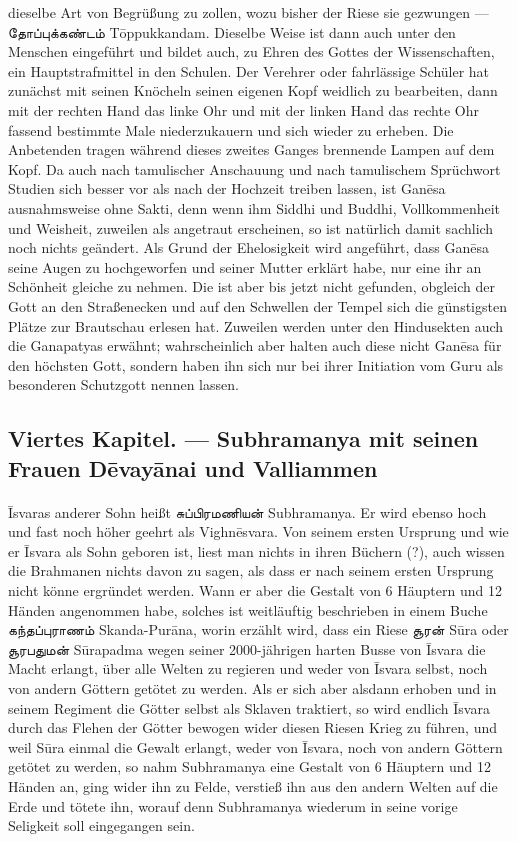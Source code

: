 \documentclass{article}
\newcommand{\TamilText}[1]{\texttamil{#1}}
\newcommand{\tam}[1]{\TamilText{#1}}
\begin{document}
dieselbe Art von Begrüßung zu zollen, wozu bisher der Riese sie gezwungen — \tam{தோப்புக்கண்டம்} T\={o}ppukkandam. Dieselbe Weise ist dann auch unter den Menschen eingeführt und bildet auch, zu Ehren des Gottes der Wissenschaften, ein Hauptstrafmittel in den Schulen. Der Verehrer oder fahrlässige Schüler hat zunächst mit seinen Knöcheln seinen eigenen Kopf weidlich zu bearbeiten, dann mit der rechten Hand das linke Ohr und mit der linken Hand das rechte Ohr fassend bestimmte Male niederzukauern und sich wieder zu erheben. Die Anbetenden tragen während dieses zweites Ganges brennende Lampen auf dem Kopf. Da auch nach tamulischer Anschauung und nach tamulischem Sprüchwort Studien sich besser vor als nach der Hochzeit treiben lassen, ist Gan\={e}sa ausnahmsweise ohne Sakti, denn wenn ihm Siddhi und Buddhi, Vollkommenheit und Weisheit, zuweilen als angetraut erscheinen, so ist natürlich damit sachlich noch nichts geändert. Als Grund der Ehelosigkeit wird angeführt, dass Gan\={e}sa seine Augen zu hochgeworfen und seiner Mutter erklärt habe, nur eine ihr an Schönheit gleiche zu nehmen. Die ist aber bis jetzt nicht gefunden, obgleich der Gott an den Straßenecken und auf den Schwellen der Tempel sich die günstigsten Plätze zur Brautschau erlesen hat. Zuweilen werden unter den Hindusekten auch die Ganapatyas erwähnt; wahrscheinlich aber halten auch diese nicht Gan\={e}sa für den höchsten Gott, sondern haben ihn sich nur bei ihrer Initiation vom Guru als besonderen Schutzgott nennen lassen.
\clearpage
\subsection{Viertes Kapitel. — Subhramanya mit seinen Frauen D\={e}vay\={a}nai und Valliammen}
\paragraph{}
\={I}svaras anderer Sohn heißt \tam{சுப்பிரமணியன்} Subhramanya. Er wird ebenso hoch und fast noch höher geehrt als Vighn\={e}svara. Von seinem ersten Ursprung und wie er \={I}svara als Sohn geboren ist, liest man nichts in ihren Büchern (?), auch wissen die Brahmanen nichts davon zu sagen, als dass er nach seinem ersten Ursprung nicht könne ergründet werden. Wann er aber die Gestalt von 6 Häuptern und 12 Händen angenommen habe, solches ist weitläuftig beschrieben in einem Buche \tam{கந்தப்புராணம்} Skanda-Pur\={a}na, worin erzählt wird, dass ein Riese \tam{சூரன்} S\={u}ra oder \tam{சூரபதுமன்} S\={u}rapadma wegen seiner 2000-jährigen harten Busse von \={I}svara die Macht erlangt, über alle Welten zu regieren und weder von \={I}svara selbst, noch von andern Göttern getötet zu werden. Als er sich aber alsdann erhoben und in seinem Regiment die Götter selbst als Sklaven traktiert, so wird endlich \={I}svara durch das Flehen der Götter bewogen wider diesen Riesen Krieg zu führen, und weil S\={u}ra einmal die Gewalt erlangt, weder von \={I}svara, noch von andern Göttern getötet zu werden, so nahm Subhramanya eine Gestalt von 6 Häuptern und 12 Händen an, ging wider ihn zu Felde, verstieß ihn aus den andern Welten auf die Erde und tötete ihn, worauf denn Subhramanya wiederum in seine vorige Seligkeit soll eingegangen sein.
\end{document}
